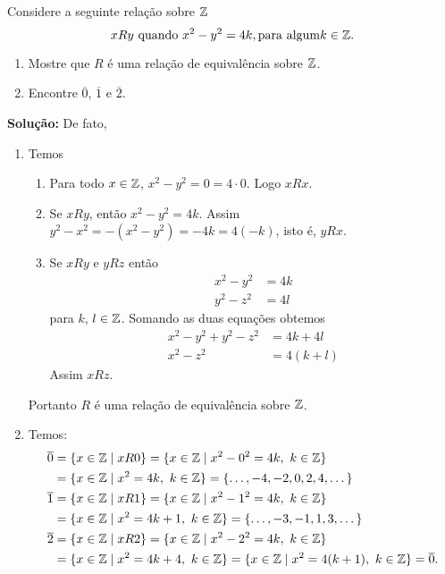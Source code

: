 \documentclass[12pt]{article}
\begin{document}
\vspace{.5cm}

\questao Considere a seguinte rela\c{c}\~ao sobre $\mathbb{Z}$
\[
	xRy \mbox{ quando } x^2 - y^2 = 4k, \mbox{para algum} k \in \mathbb{Z}.
\]

\begin{enumerate}[label={\alph*})]
	\item Mostre que $R$ \'e uma rela{\c c}{\~a}o de equival{\^e}ncia sobre $\mathbb{Z}$.
	\item Encontre $\overline{0}$, $\overline{1}$ e $\overline{2}$.
\end{enumerate}

\noindent\textbf{Solu\c{c}\~ao:} De fato,
	\begin{enumerate}[label={\alph*})]
		\item Temos
		\begin{enumerate}[label={\roman*})]
			\item Para todo $x \in \mathbb{Z}$, $x^2 - y^2 = 0 = 4\cdot 0$. Logo $xRx$.
			\item Se $xRy$, ent\~ao $x^2 - y^2 = 4k$. Assim $y^2 - x^2 = -(x^2 - y^2) = -4k = 4(-k)$, isto \'e, $yRx$.
			\item Se $xRy$ e $yRz$ ent\~ao
			\begin{align}
				x^2 - y^2 &= 4k\label{primeira_equacao}\\
				y^2 - z^2 &= 4l\label{segunda_equacao}
			\end{align}
			para $k$, $l \in \mathbb{Z}$.
			Somando as duas equa\c{c}\~oes obtemos
			\begin{align}\label{terceira_equacao}
				x^2 - y^2 + y^2 - z^2 &= 4k + 4l\\
				x^2 - z^2 &= 4(k + l)
			\end{align}
			Assim $xRz$.
		\end{enumerate}

		Portanto $R$ \'e uma rela\c{c}\~ao de equival\^encia sobre $\mathbb{Z}$.

		\item Temos:
		\begin{align*}
			\overline{0} &= \{x \in \mathbb{Z} \mid xR0\} = \{x \in \mathbb{Z} \mid x^2 - 0^2 = 4k,\ k \in \mathbb{Z}\} \\
			&= \{x \in \mathbb{Z} \mid x^2 = 4k, \ k \in \mathbb{Z}\} = \{\dots, -4,-2,0,2,4, \dots\}\\
			\overline{1} &= \{x \in \mathbb{Z} \mid xR1\} = \{x \in \mathbb{Z} \mid x^2 - 1^2 = 4k,\ k \in \mathbb{Z}\} \\
			&= \{x \in \mathbb{Z} \mid x^2 = 4k + 1, \ k \in \mathbb{Z}\} = \{\dots, -3,-1,1,3, \dots\}\\
			\overline{2} &= \{x \in \mathbb{Z} \mid xR2\} = \{x \in \mathbb{Z} \mid x^2 - 2^2 = 4k,\ k \in \mathbb{Z}\} \\
			&= \{x \in \mathbb{Z} \mid x^2 = 4k + 4, \ k \in \mathbb{Z}\} = \{x \in \mathbb{Z} \mid x^2 = 4(k + 1), \ k \in \mathbb{Z}\} = \overline{0}.
		\end{align*}
	\end{enumerate}
\end{document}
